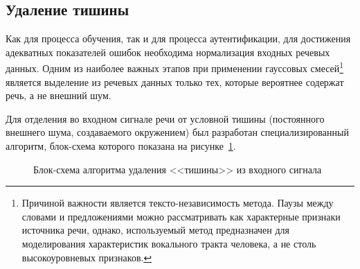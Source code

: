 \subsection{Удаление тишины}

Как для процесса обучения, так и для процесса аутентификации, для достижения адекватных показателей ошибок необходима нормализация входных речевых данных. Одним из наиболее важных этапов при применении гауссовых смесей\footnote{Причиной важности является тексто-независимость метода. Паузы между словами и предложениями можно рассматривать как характерные признаки источника речи, однако, используемый метод предназначен для моделирования характеристик вокального тракта человека, а не столь высокоуровневых признаков.} является выделение из речевых данных только тех, которые вероятнее содержат речь, а не внешний шум.

Для отделения во входном сигнале речи от условной тишины (постоянного внешнего шума, создаваемого окружением) был разработан специализированный алгоритм, блок-схема которого показана на рисунке~\ref{fig:silence_remove_flowchart}.

\begin{figure}
    \caption{Блок-схема алгоритма удаления <<тишины>> из входного сигнала}
    \label{fig:silence_remove_flowchart}
\end{figure}

